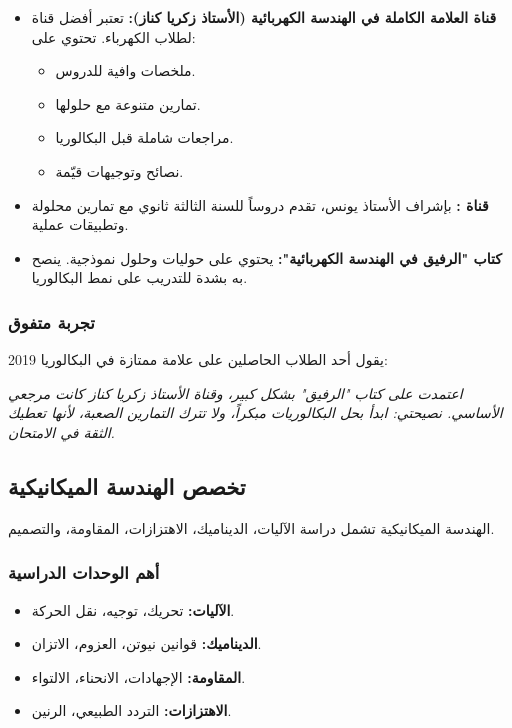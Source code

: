 \documentclass[12pt,a4paper]{book}
\newcommand{\quoteAr}[1]{%
	\begin{myquote}
		\itshape #1
	\end{myquote}
}
\begin{document}
\begin{itemize}
	\item \textbf{قناة العلامة الكاملة في الهندسة الكهربائية (الأستاذ زكريا كناز):} تعتبر أفضل قناة لطلاب الكهرباء. تحتوي على:
	\begin{itemize}
		\item ملخصات وافية للدروس.
		\item تمارين متنوعة مع حلولها.
		\item مراجعات شاملة قبل البكالوريا.
		\item نصائح وتوجيهات قيّمة.
	\end{itemize}
	\item \textbf{قناة :} بإشراف الأستاذ يونس، تقدم دروساً للسنة الثالثة ثانوي مع تمارين محلولة وتطبيقات عملية.
	\item \textbf{كتاب "الرفيق في الهندسة الكهربائية":} يحتوي على حوليات وحلول نموذجية. ينصح به بشدة للتدريب على نمط البكالوريا.
\end{itemize}

\subsubsection{تجربة متفوق}

يقول أحد الطلاب الحاصلين على علامة ممتازة في البكالوريا 2019:

\quoteAr{اعتمدت على كتاب "الرفيق" بشكل كبير، وقناة الأستاذ زكريا كناز كانت مرجعي الأساسي. نصيحتي: ابدأ بحل البكالوريات مبكراً، ولا تترك التمارين الصعبة، لأنها تعطيك الثقة في الامتحان.}

\subsection{تخصص الهندسة الميكانيكية}

الهندسة الميكانيكية تشمل دراسة الآليات، الديناميك، الاهتزازات، المقاومة، والتصميم.

\subsubsection{أهم الوحدات الدراسية}

\begin{itemize}
	\item \textbf{الآليات:} تحريك، توجيه، نقل الحركة.
	\item \textbf{الديناميك:} قوانين نيوتن، العزوم، الاتزان.
	\item \textbf{المقاومة:} الإجهادات، الانحناء، الالتواء.
	\item \textbf{الاهتزازات:} التردد الطبيعي، الرنين.
\end{itemize}
\end{document}
